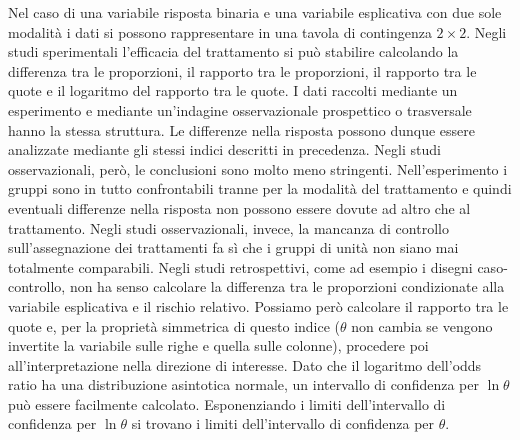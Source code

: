 \documentclass[
  11pt,
]{krantz}
\theoremstyle{definition}
\theoremstyle{definition}
\theoremstyle{definition}
\theoremstyle{definition}
\theoremstyle{remark}
\begin{document}
Nel caso di una variabile risposta binaria e una variabile esplicativa con due sole modalità i dati si possono rappresentare in una tavola di contingenza \(2 \times 2\). Negli studi sperimentali l'efficacia del trattamento si può stabilire calcolando la differenza tra le proporzioni, il rapporto tra le proporzioni, il rapporto tra le quote e il logaritmo del rapporto tra le quote. I dati raccolti mediante un esperimento e mediante un'indagine osservazionale prospettico o trasversale hanno la stessa struttura. Le differenze nella risposta possono dunque essere analizzate mediante gli stessi indici descritti in precedenza. Negli studi osservazionali, però, le conclusioni sono molto meno stringenti. Nell'esperimento i gruppi sono in tutto confrontabili tranne per la modalità del trattamento e quindi eventuali differenze nella risposta non possono essere dovute ad altro che al trattamento. Negli studi osservazionali, invece, la mancanza di controllo sull'assegnazione dei trattamenti fa sì che i gruppi di unità non siano mai totalmente comparabili. Negli studi retrospettivi, come ad esempio i disegni caso-controllo, non ha senso calcolare la differenza tra le proporzioni condizionate alla variabile esplicativa e il rischio relativo. Possiamo però calcolare il rapporto tra le quote e, per la proprietà simmetrica di questo indice (\(\theta\) non cambia se vengono invertite la variabile sulle righe e quella sulle colonne), procedere poi all'interpretazione nella direzione di interesse. Dato che il logaritmo dell'odds ratio ha una distribuzione asintotica normale, un intervallo di confidenza per \(\ln \theta\) può essere facilmente calcolato. Esponenziando i limiti dell'intervallo di confidenza per \(\ln \theta\) si trovano i limiti dell'intervallo di confidenza per \(\theta\).

  

\printindex
\end{document}
